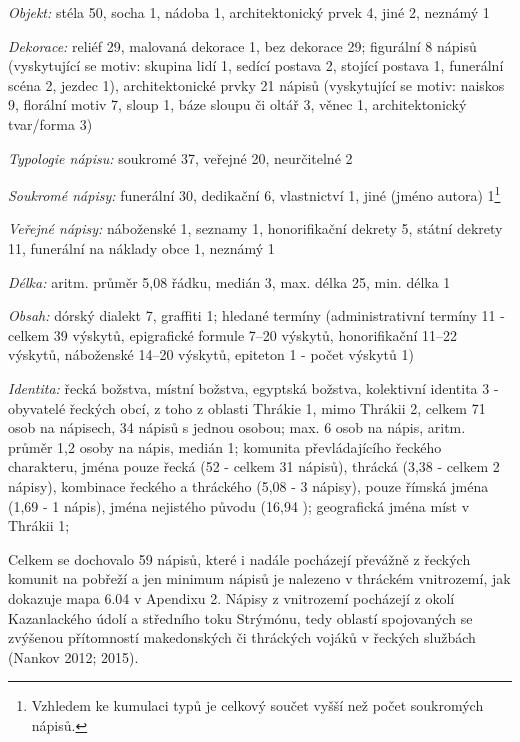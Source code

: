 {\em Objekt:} stéla 50, socha 1, nádoba 1, architektonický prvek 4, jiné 2, neznámý 1

{\em Dekorace:} reliéf 29, malovaná dekorace 1, bez dekorace 29; figurální 8 nápisů (vyskytující se motiv: skupina lidí 1, sedící postava 2, stojící postava 1, funerální scéna 2, jezdec 1), architektonické prvky 21 nápisů (vyskytující se motiv: naiskos 9, florální motiv 7, sloup 1, báze sloupu či oltář 3, věnec 1, architektonický tvar/forma 3)

{\em Typologie nápisu:} soukromé 37, veřejné 20, neurčitelné 2

{\em Soukromé nápisy:} funerální 30, dedikační 6, vlastnictví 1, jiné (jméno autora) 1\footnote{Vzhledem ke kumulaci typů je celkový součet vyšší než počet soukromých nápisů.}

{\em Veřejné nápisy:} náboženské 1, seznamy 1, honorifikační dekrety 5, státní dekrety 11, funerální na náklady obce 1, neznámý 1

{\em Délka:} aritm. průměr 5,08 řádku, medián 3, max. délka 25, min. délka 1

{\em Obsah:} dórský dialekt 7, graffiti 1; hledané termíny (administrativní termíny 11 - celkem 39 výskytů, epigrafické formule 7--20 výskytů, honorifikační 11--22 výskytů, náboženské 14--20 výskytů, epiteton 1 - počet výskytů 1)

{\em Identita:} řecká božstva, místní božstva, egyptská božstva, kolektivní identita 3 - obyvatelé řeckých obcí, z toho z oblasti Thrákie 1, mimo Thrákii 2, celkem 71 osob na nápisech, 34 nápisů s jednou osobou; max. 6 osob na nápis, aritm. průměr 1,2 osoby na nápis, medián 1; komunita převládajícího řeckého charakteru, jména pouze řecká (52  - celkem 31 nápisů), thrácká (3,38  - celkem 2 nápisy), kombinace řeckého a thráckého (5,08  - 3 nápisy), pouze římská jména (1,69  - 1 nápis), jména nejistého původu (16,94 ); geografická jména míst v Thrákii 1;

\NC\AR
\HL
\HL
\stoptable

Celkem se dochovalo 59 nápisů, které i nadále pocházejí převážně z řeckých komunit na pobřeží a jen minimum nápisů je nalezeno v thráckém vnitrozemí, jak dokazuje mapa 6.04 v Apendixu 2. Nápisy z vnitrozemí pocházejí z okolí Kazanlackého údolí a středního toku Strýmónu, tedy oblastí spojovaných se zvýšenou přítomností makedonských či thráckých vojáků v řeckých službách (Nankov 2012; 2015).

